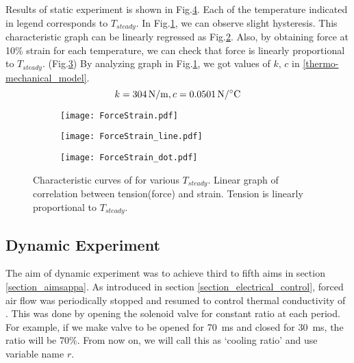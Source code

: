 Results of static experiment is shown in Fig.\ref{static1_results}. Each of the temperature indicated in legend corresponds to $T_{steady}$. In Fig.\ref{static1_result}, we can observe slight hysteresis. This characteristic graph can be linearly regressed as Fig.\ref{static1_line}. Also, by obtaining force at 10\% strain for each temperature, we can check that force is linearly proportional to $T_{steady}$. (Fig.\ref{static1_dot}) By analyzing graph in Fig.\ref{static1_result}, we got values of $k$, $c$ in \eqref{thermo-mechanical_model}.
\begin{equation}
k=\SI{304}{\newton\per\meter}, c=\SI{0.0501}{\newton\per\degreeCelsius} \notag
\end{equation}

\begin{figure}[t]
	\centering
	\begin{subfigure}[t]{0.3\textwidth}
		\texttt{[image: ForceStrain.pdf]}
		\caption{\label{static1_result}}
	\end{subfigure}%
	\begin{subfigure}[t]{0.3\textwidth}
		\texttt{[image: ForceStrain\_line.pdf]}
		\caption{\label{static1_line}}
	\end{subfigure}%
	\begin{subfigure}[t]{0.3\textwidth}
		\texttt{[image: ForceStrain\_dot.pdf]}
		\caption{\label{static1_dot}}
	\end{subfigure}
	\caption[Results of static experiment]{ Characteristic curves of \scp for various $T_{steady}$.  Linear graph of correlation between tension(force) and strain.  Tension is linearly proportional to $T_{steady}$.}
	\label{static1_results}
\end{figure}

\subsection{Dynamic Experiment}\label{section_dynamic} %
The aim of dynamic experiment was to achieve third to fifth aims in section \ref{section_aimsappa}.
As introduced in section \ref{section_electrical_control}, forced air flow was periodically stopped and resumed to control thermal conductivity of \scpnospace.
This was done by opening the solenoid valve for constant ratio at each period. For example, if we make valve to be opened for \SI{70}{\milli\second} and closed for \SI{30}{\milli\second}, the ratio will be 70\%. From now on, we will call this as `cooling ratio' and use variable name $r$.
 

